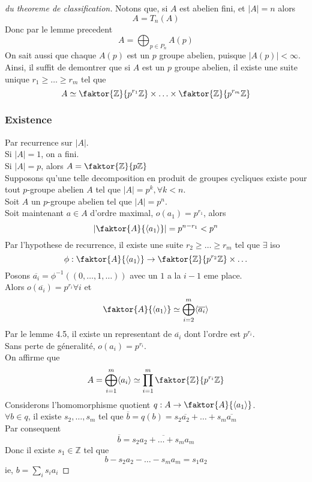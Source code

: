 \documentclass[../main.tex]{subfiles}
\begin{document}
\begin{proof}[du theoreme de classification]
	Notons que, si $A$ est abelien fini, et $|A| = n$ alors
	\[ 
	A= T_n( A) 
	\]
	Donc par le lemme precedent 
	\[ 
	A= \bigoplus_{p\in P_n} A( p) 
	\]
	On sait aussi que chaque $A( p) $ est un $p$ groupe abelien, puisque $|A( p) |< \infty $.\\
	Ainsi, il suffit de demontrer que si $A$ est un $p$ groupe abelien, il existe une suite unique $r_1 \geq \ldots \geq r_m$ tel que
	\[ 
	A \simeq \faktor{\mathbb{Z}}{p^{r_1}\mathbb{Z}}\times \ldots \times \faktor{\mathbb{Z}}{p^{r_m}\mathbb{Z}}
	\]
\subsubsection*{Existence}
Par recurrence sur $|A|$.\\
Si $|A| = 1$, on a fini.\\
Si $|A| = p $, alors $A = \faktor{\mathbb{Z}}{p \mathbb{Z}}$ \\
Supposons qu'une telle decomposition en produit de groupes cycliques existe pour tout $p$-groupe abelien $A$ tel que $|A| = p^{k}, \forall k < n$.\\
Soit $A$ un $p$-groupe abelien tel que $|A| = p^{n}$.\\
Soit maintenant $a\in A$ d'ordre maximal, $o( a_1) = p^{r_1}$, alors
\[ 
| \faktor{A}{\langle a_{1}\rangle}| = p^{n-r_1}< p^{n}
\]
Par l'hypothese de recurrence, il existe une suite $r_2 \geq \ldots \geq r_m$ tel que $\exists $ iso 
\[ 
\phi: \faktor{A}{\langle a_1\rangle}\to \faktor{\mathbb{Z}}{p^{r_2}\mathbb{Z}}\times\ldots
\]
Posons $ \overline{a_i}= \phi^{-1}( ( 0, \ldots, 1, \ldots) ) $ avec un $1$ a la $i-1$ eme place.\\
Alors $o( \overline{a_i}) = p^{r_i}\forall i$ et
\[ 
\faktor{A}{\langle a_1\rangle}\simeq \bigoplus_{i=2}^{m} \langle \overline{a_i}\rangle
\]
Par le lemme 4.5, il existe un representant de $ \overline{a_i}$ dont l'ordre est $p^{r_i}$.\\
Sans perte de géneralité, $o( a_i) = p^{r_i}$.\\
On affirme que 
\[ 
A = \bigoplus_{i=1}^{m} \langle a_i \rangle \simeq \prod_{i=1}^{m} \faktor{\mathbb{Z}}{p^{r_i}\mathbb{Z}}
\]
Considerons l'homomorphisme quotient $q: A \to \faktor{A}{\langle a_1\rangle}$.\\
$\forall b \in q$, il existe $s_2, \ldots, s_m$ tel que $ \overline{b}= q( b) = s_2 \overline{a_2}+ \ldots + s_m \overline{a_m}$ 	\\
Par consequent 
\[ 
\overline{b}= \overline{s_2a_2+ \ldots+ s_m a_m}
\]
Donc il existe $s_1\in \mathbb{Z}$ tel que
\[ 
b - s_2a_2- \ldots - s_m a_m = s_1a_2
\]
ie, $b = \sum_i s_i a_i$


\end{proof}
\end{document}
